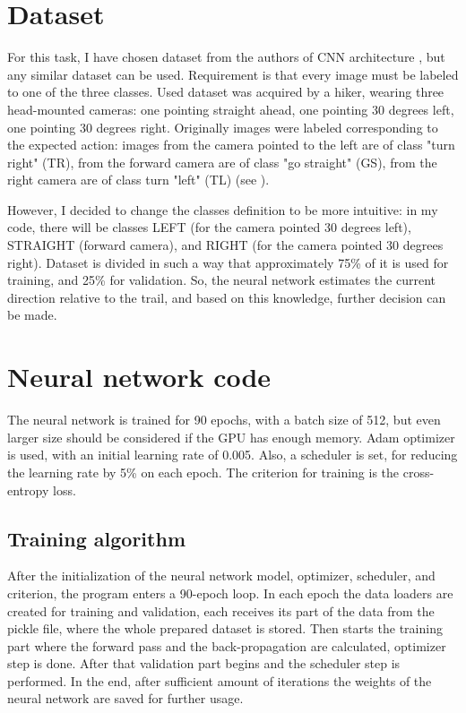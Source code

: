 \section{Dataset}

For this task, I have chosen dataset from the authors of \acs{CNN} architecture \cite{giusti2016machine}, but any similar dataset can be used. Requirement is that every image must be labeled to one of the three classes. Used dataset was acquired by a hiker, wearing three head-mounted cameras: one pointing straight ahead, one pointing 30 degrees left, one pointing 30 degrees right. Originally images were labeled corresponding to the expected action: images from the camera pointed to the left are of class "turn right" (TR), from the forward camera are of class "go straight" (GS), from the right camera are of class turn "left" (TL) (see ).

However, I decided to change the classes definition to be more intuitive: in my code, there will be classes LEFT (for the camera pointed 30 degrees left), STRAIGHT (forward camera), and RIGHT (for the camera pointed 30 degrees right). Dataset is divided in such a way that approximately 75\% of it is used for training, and 25\% for validation. So, the neural network estimates the current direction relative to the trail, and based on this knowledge, further decision can be made.

\section{Neural network code}

The neural network is trained for 90 epochs, with a batch size of 512, but even larger size should be considered if the GPU has enough memory. Adam optimizer is used, with an initial learning rate of 0.005. Also, a scheduler is set, for reducing the learning rate by 5\% on each epoch. The criterion for training is the cross-entropy loss. 

\subsection{Training algorithm}

After the initialization of the neural network model, optimizer, scheduler, and criterion, the program enters a 90-epoch loop. In each epoch the data loaders are created for training and validation, each receives its part of the data from the pickle file, where the whole prepared dataset is stored. Then starts the training part where the forward pass and the back-propagation are calculated, optimizer step is done. After that validation part begins and the scheduler step is performed. In the end, after sufficient amount of iterations the weights of the neural network are saved for further usage.

